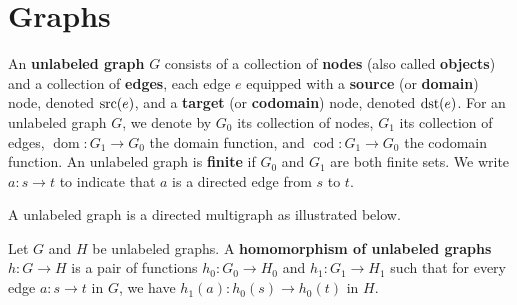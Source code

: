 \documentclass{book}
\begin{document}
 \chapter{Graphs}
    \label{sec:graphs}
    \begin{definition}
        \label{def:graph:unlabeled}
        An \textbf{unlabeled graph} \( G \) consists of a collection of \textbf{nodes} (also called \textbf{objects}) and a collection of \textbf{edges}, each edge $e$ equipped with a \textbf{source} (or \textbf{domain}) node, denoted $\operatorname{src}(e)$, and a \textbf{target} (or \textbf{codomain}) node, denoted $\operatorname{dst}(e)$. 
        For an unlabeled graph \( G \), we denote by \( G_0 \) its collection of nodes, \( G_1 \) its collection of edges, \( \operatorname{dom}:G_1{\to}G_0 \) the domain function, and \( \operatorname{cod}:G_1{\to}G_0 \) the codomain function. An unlabeled graph is \textbf{finite} if \( G_0 \) and \( G_1 \) are both finite sets.
        We write \( a: s \to t \) to indicate that \( a \) is a directed edge from \( s \) to \( t \). 
    \end{definition}   
    \begin{example}
      A unlabeled graph is a directed multigraph as illustrated below.
       
        \begin{center}
      \end{center} 
    \end{example}
    \begin{definition}
        \label{def:unlabeled_graph:homomorphism}
        Let \( G \) and \( H \) be unlabeled graphs. A \textbf{homomorphism of unlabeled graphs} $h: G \to H$ is a pair of functions $h_0: G_0 \to H_0 $ and $h_1: G_1 \to H_1$ such that for every edge \( a: s \to t \) in \( G \), we have \( h_1(a) : h_0(s) \to h_0(t) \) in \( H \).
    \end{definition}
\end{document}
